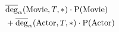 $\!\begin{aligned}
  &\avgdeg_\alpha(\text{Movie}, T, *) \cdot \sprob(\text{Movie}) \\
  &+ \avgdeg_\alpha(\text{Actor}, T, *) \cdot \sprob(\text{Actor})
\end{aligned}$
